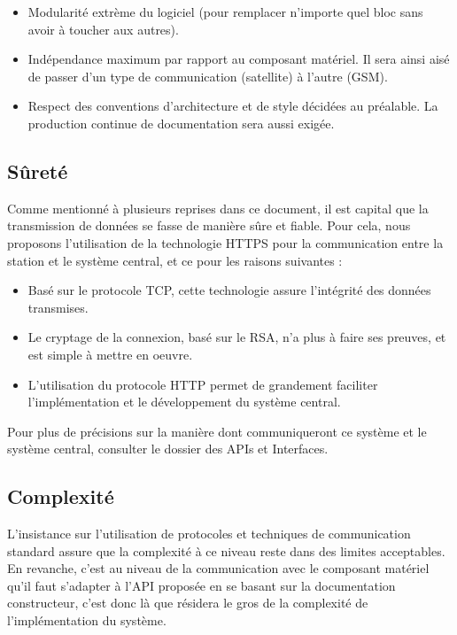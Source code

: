 \begin{itemize}
\item Modularité extrème du logiciel (pour remplacer n'importe quel bloc sans avoir à toucher aux autres).
\item Indépendance maximum par rapport au composant matériel. Il sera ainsi aisé de passer d'un type de communication (satellite) à l'autre (GSM).
\item Respect des conventions d'architecture et de style décidées au préalable. La production continue de documentation sera aussi exigée.
\end{itemize}


\subsection{Sûreté}

Comme mentionné à plusieurs reprises dans ce document, il est capital que la transmission de données se fasse de manière sûre et fiable. Pour cela, nous proposons l'utilisation de la technologie HTTPS pour la communication entre la station et le système central, et ce pour les raisons suivantes :

\begin{itemize}
\item Basé sur le protocole TCP, cette technologie assure l'intégrité des données transmises.
\item Le cryptage de la connexion, basé sur le RSA, n'a plus à faire ses preuves, et est simple à mettre en oeuvre.
\item L'utilisation du protocole HTTP permet de grandement faciliter l'implémentation et le développement du système central.
\end{itemize}

Pour plus de précisions sur la manière dont communiqueront ce système et le système central, consulter le dossier des APIs et Interfaces.

\subsection{Complexité}

L'insistance sur l'utilisation de protocoles et techniques de communication standard assure que la complexité à ce niveau reste dans des limites acceptables. En revanche, c'est au niveau de la communication avec le composant matériel qu'il faut s'adapter à l'API proposée en se basant sur la documentation constructeur, c'est donc là que résidera le gros de la complexité de l'implémentation du système.

